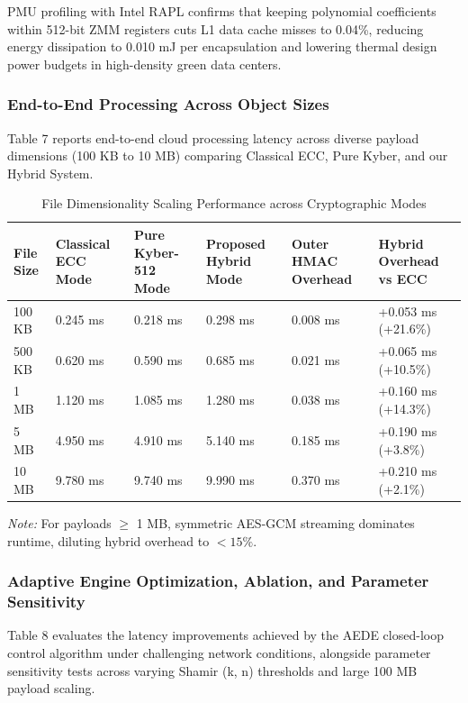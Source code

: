 \documentclass[5p,times]{elsarticle}
\begin{document}
PMU profiling with Intel RAPL confirms that keeping polynomial coefficients within 512-bit ZMM registers cuts L1 data cache misses to 0.04\%, reducing energy dissipation to 0.010 mJ per encapsulation and lowering thermal design power budgets in high-density green data centers.


\subsubsection{End-to-End Processing Across Object Sizes}

Table 7 reports end-to-end cloud processing latency across diverse payload dimensions (100 KB to 10 MB) comparing Classical ECC, Pure Kyber, and our Hybrid System.

\begin{table}[!t]
  \centering
  \footnotesize
  \caption{File Dimensionality Scaling Performance across Cryptographic Modes}
  \label{tab:7}
  \begin{tabularx}{\textwidth}{p{2.2cm}p{2.6cm}p{2.6cm}p{2.8cm}p{2.6cm}X}
    \toprule
    \textbf{File Size} & \textbf{Classical ECC Mode} & \textbf{Pure Kyber-512 Mode} & \textbf{Proposed Hybrid Mode} & \textbf{Outer HMAC Overhead} & \textbf{Hybrid Overhead vs ECC} \\
    \midrule
    100 KB & 0.245 ms & 0.218 ms & 0.298 ms & 0.008 ms & +0.053 ms (+21.6\%) \\
    500 KB & 0.620 ms & 0.590 ms & 0.685 ms & 0.021 ms & +0.065 ms (+10.5\%) \\
    1 MB & 1.120 ms & 1.085 ms & 1.280 ms & 0.038 ms & +0.160 ms (+14.3\%) \\
    5 MB & 4.950 ms & 4.910 ms & 5.140 ms & 0.185 ms & +0.190 ms (+3.8\%) \\
    10 MB & 9.780 ms & 9.740 ms & 9.990 ms & 0.370 ms & +0.210 ms (+2.1\%) \\
    \bottomrule
  \end{tabularx}
  \vspace{2pt}
  \flushleft\scriptsize \textit{Note:} For payloads $\ge$ 1 MB, symmetric AES-GCM streaming dominates runtime, diluting hybrid overhead to $< 15\%$.
\end{table}


\subsubsection{Adaptive Engine Optimization, Ablation, and Parameter Sensitivity}

Table 8 evaluates the latency improvements achieved by the AEDE closed-loop control algorithm under challenging network conditions, alongside parameter sensitivity tests across varying Shamir (k, n) thresholds and large 100 MB payload scaling.
\end{document}
